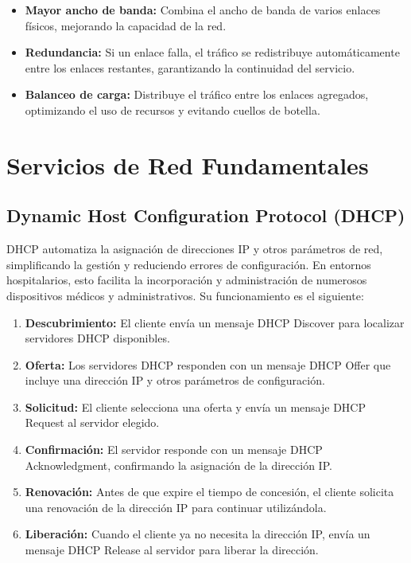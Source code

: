 \begin{itemize}
    \item \textbf{Mayor ancho de banda:} Combina el ancho de banda de varios enlaces físicos, mejorando la capacidad de la red.
    \item \textbf{Redundancia:} Si un enlace falla, el tráfico se redistribuye automáticamente entre los enlaces restantes, garantizando la continuidad del servicio.
    \item \textbf{Balanceo de carga:} Distribuye el tráfico entre los enlaces agregados, optimizando el uso de recursos y evitando cuellos de botella.
\end{itemize}

\section{Servicios de Red Fundamentales}
\subsection{Dynamic Host Configuration Protocol (DHCP)}
\label{subsec:dhcp}
DHCP automatiza la asignación de direcciones IP y otros parámetros de red, simplificando la gestión y reduciendo errores de configuración. En entornos hospitalarios, esto facilita la 
incorporación y administración de numerosos dispositivos médicos y administrativos. Su funcionamiento es el siguiente:
\begin{enumerate}
    \item \textbf{Descubrimiento:} El cliente envía un mensaje DHCP Discover para localizar servidores DHCP disponibles.
    \item \textbf{Oferta:} Los servidores DHCP responden con un mensaje DHCP Offer que incluye una dirección IP y otros parámetros de configuración.
    \item \textbf{Solicitud:} El cliente selecciona una oferta y envía un mensaje DHCP Request al servidor elegido.
    \item \textbf{Confirmación:} El servidor responde con un mensaje DHCP Acknowledgment, confirmando la asignación de la dirección IP.
    \item \textbf{Renovación:} Antes de que expire el tiempo de concesión, el cliente solicita una renovación de la dirección IP para continuar utilizándola.
    \item \textbf{Liberación:} Cuando el cliente ya no necesita la dirección IP, envía un mensaje DHCP Release al servidor para liberar la dirección.
\end{enumerate}

